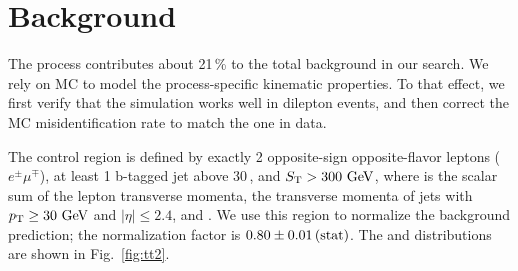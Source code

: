 \section{\texorpdfstring{\ttbar}{TTbar} Background}
\label{sec:bkg_tt}

The \ttbar process contributes about 21\,\% to the total background in our search. We rely on MC to model the process-specific kinematic properties. To that effect, we first verify that the simulation works well in dilepton events, and then correct the MC misidentification rate to match the one in data.

The \ttbar control region is defined by exactly 2 opposite-sign opposite-flavor leptons ($e^\pm \mu^\mp$), at least 1 b-tagged jet above 30\,\GeV, and $S_{\mathrm{T}} > 300\,\,\text{Ge\hspace{-.08em}V}$, where \ST is the scalar sum of the lepton transverse momenta, the transverse momenta of jets with $p_{\mathrm{T}} \geq 30\,\,\text{Ge\hspace{-.08em}V}$ and $|\eta| \leq 2.4$, and \MET. We use this region to normalize the background prediction; the normalization factor is $0.80 \pm 0.01\,\text{(stat)}$. The \MET and \ST distributions are shown in Fig.~\ref{fig:tt2}.

